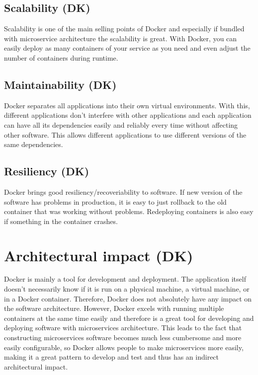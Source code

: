 \documentclass[fleqn,12pt]{olplainarticle}
\begin{document}
\subsection{Scalability (DK)}
Scalability is one of the main selling points of Docker and especially if bundled with microservice architecture the scalability is great. With Docker, you can easily deploy as many containers of your service as you need and even adjust the number of containers during runtime.

\subsection{Maintainability (DK)}
Docker separates all applications into their own virtual environments. With this, different applications don't interfere with other applications and each application can have all its dependencies easily and reliably every time without affecting other software. This allows different applications to use different versions of the same dependencies.

\subsection{Resiliency (DK)}
Docker brings good resiliency/recoveriability to software. If new version of the software has problems in production, it is easy to just rollback to the old 
container that was working without problems. Redeploying containers is also easy if something in the container crashes.

\section{Architectural impact (DK)}


Docker is mainly a tool for development and deployment. The application itself doesn't necessarily know if it is run on a physical machine, a virtual machine, or in a Docker container. Therefore, Docker does not absolutely have any impact on the software architecture. However, Docker excels with running multiple containers at the same time easily and therefore is a great tool for developing and deploying software with microservices architecture. This leads to the fact
that constructing microservices software becomes much less cumbersome and more easily configurable, so Docker allows people to make microservices more easily, making it a great pattern to develop and test and thus has an indirect architectural impact.
\end{document}
